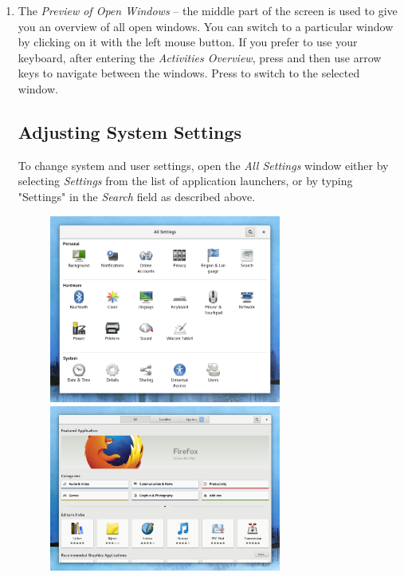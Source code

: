 \begin{enumerate}
\item The \emph{Preview of Open Windows} -- the middle part of the screen is used to give you an overview of all open windows. You can switch to a particular window by clicking on it with the left mouse button. If you prefer to use your keyboard, after entering the \emph{Activities Overview}, press  and then use arrow keys to navigate between the windows. Press  to switch to the selected window.

\subsection*{Adjusting System Settings}

To change system and user settings, open the \emph{All Settings} window either by selecting \emph{Settings} from the list of application launchers, or by typing "Settings" in the \emph{Search} field as described above.


\begin{figure}[p]
\begin{center}
\includegraphics[width=0.72\textwidth]{img/settings}
 \label{fig:settings}
\bigskip
\includegraphics[width=0.72\textwidth]{img/software}
 \label{fig:software}
\end{center}
\end{figure}


\end{enumerate}
